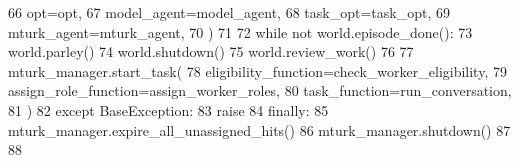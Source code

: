 \begin{DoxyCode}
66                 opt=opt,
67                 model\_agent=model\_agent,
68                 task\_opt=task\_opt,
69                 mturk\_agent=mturk\_agent,
70             )
71 
72             \textcolor{keywordflow}{while} \textcolor{keywordflow}{not} world.episode\_done():
73                 world.parley()
74             world.shutdown()
75             world.review\_work()
76 
77         mturk\_manager.start\_task(
78             eligibility\_function=check\_worker\_eligibility,
79             assign\_role\_function=assign\_worker\_roles,
80             task\_function=run\_conversation,
81         )
82     \textcolor{keywordflow}{except} BaseException:
83         \textcolor{keywordflow}{raise}
84     \textcolor{keywordflow}{finally}:
85         mturk\_manager.expire\_all\_unassigned\_hits()
86         mturk\_manager.shutdown()
87 
88 
\end{DoxyCode}
